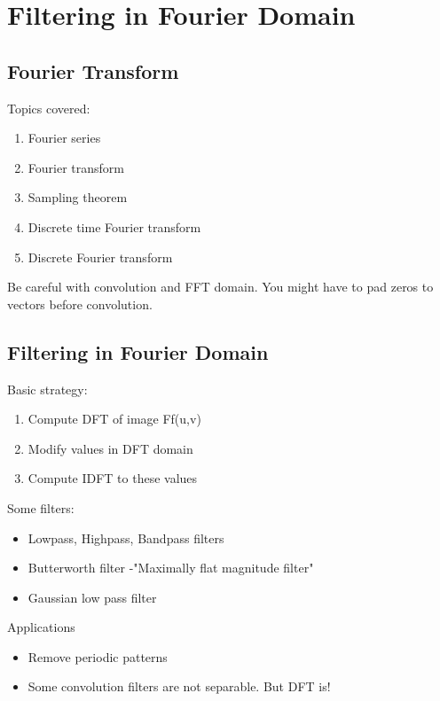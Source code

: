 \documentclass[a4paper]{article}
\begin{document}
\section{Filtering in Fourier Domain}
\subsection{Fourier Transform}
Topics covered:
\begin{enumerate}
\item Fourier series
\item Fourier transform
\item Sampling theorem
\item Discrete time Fourier transform
\item Discrete Fourier transform
\end{enumerate}
Be careful with convolution and FFT domain. You might have to pad zeros to vectors before convolution.
\subsection{Filtering in Fourier Domain}
Basic strategy:
\begin{enumerate}
\item Compute DFT of image Ff(u,v)
\item Modify values in DFT domain
\item Compute IDFT to these values
\end{enumerate}
Some filters:
\begin{itemize}
\item Lowpass, Highpass, Bandpass filters
\item Butterworth filter -"Maximally flat magnitude filter"
\item Gaussian low pass filter
\end{itemize}
Applications
\begin{itemize}
\item Remove periodic patterns
\item Some convolution filters are not separable. But DFT is! 

\end{itemize}
\end{document}

